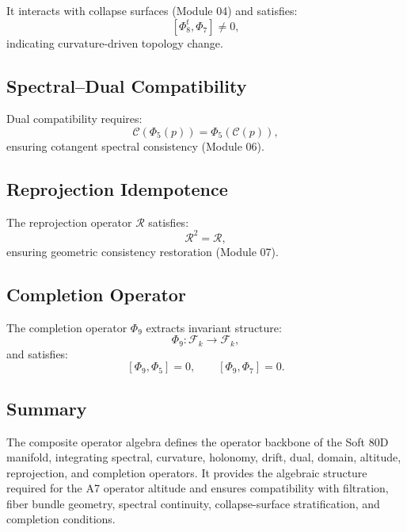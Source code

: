 It interacts with collapse surfaces (Module 04) and satisfies:
\[
[\Phi_8^t, \Phi_7] \neq 0,
\]
indicating curvature-driven topology change.

\subsection{Spectral–Dual Compatibility}
Dual compatibility requires:
\[
\mathcal{C}(\Phi_5(p)) = \Phi_5(\mathcal{C}(p)),
\]
ensuring cotangent spectral consistency (Module 06).

\subsection{Reprojection Idempotence}
The reprojection operator $\mathcal{R}$ satisfies:
\[
\mathcal{R}^2 = \mathcal{R},
\]
ensuring geometric consistency restoration (Module 07).

\subsection{Completion Operator}
The completion operator $\Phi_9$ extracts invariant structure:
\[
\Phi_9 : \mathcal{F}_k \to \mathcal{F}_k,
\]
and satisfies:
\[
[\Phi_9, \Phi_5] = 0,
\qquad
[\Phi_9, \Phi_7] = 0.
\]

\subsection{Summary}
The composite operator algebra defines the operator backbone of the Soft 80D
manifold, integrating spectral, curvature, holonomy, drift, dual, domain,
altitude, reprojection, and completion operators. It provides the algebraic
structure required for the A7 operator altitude and ensures compatibility with
filtration, fiber bundle geometry, spectral continuity, collapse-surface
stratification, and completion conditions.

